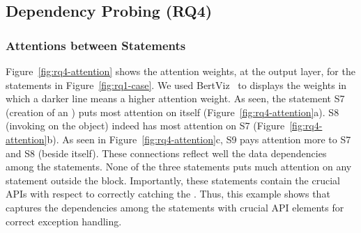 \subsection{Dependency Probing (RQ4)}
\label{sec:rq4}


\subsubsection{Attentions between Statements}
Figure~\ref{fig:rq4-attention} shows the attention weights, at the
output layer, for the statements in Figure~\ref{fig:rq1-case}. We used
BertViz~\cite{bertviz} to displays the weights in which a darker line
means a higher attention weight. As seen, the statement S7 (creation
of an ) puts most attention on itself
(Figure~\ref{fig:rq4-attention}a). S8 (invoking 
on the  object) indeed has most attention on S7
(Figure~\ref{fig:rq4-attention}b). As seen in
Figure~\ref{fig:rq4-attention}c, S9 pays attention more to S7 and S8
(beside itself). These connections reflect well the data dependencies
among the statements. None of the three statements puts much attention
on any statement outside the  block. Importantly, these
statements contain the crucial APIs with respect to correctly catching
the . Thus, this example shows that {\tool} captures
the dependencies among the statements with crucial API elements for
correct exception handling.


